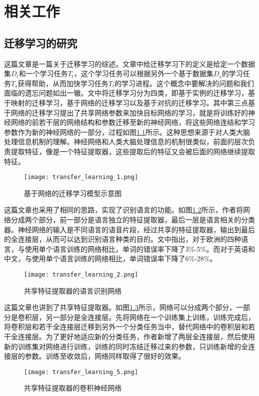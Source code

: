 
\chapter{相关工作}
\section{迁移学习的研究}

这篇文章\cite{10.1007/978-3-030-01424-7_27}是一篇关于迁移学习的综述。文章中给迁移学习下的定义是给定一个数据集$D_t$和一个学习任务$T_t$，这个学习任务可以根据另外一个基于数据集$D_s$的学习任务$T_s$获得帮助，从而加快学习任务$T_t$的学习进程。这个概念中要解决的问题和我们面临的遗忘问题如出一辙。文中将迁移学习分为四类，即基于实例的迁移学习，基于映射的迁移学习，基于网络的迁移学习以及基于对抗的迁移学习。其中第三点基于网络的迁移学习提出了共享网络参数来加快目标网络的学习，就是将训练好的神经网络的前若干层的网络结构和参数迁移至新的神经网络，将这些网络连结和学习参数作为新的神经网络的一部分，过程如图\ref{fig:transfer_learning_1}所示。这种思想来源于对人类大脑处理信息机制的理解。神经网络和人类大脑处理信息的机制很类似，前面的层次负责提取特征，像是一个特征提取器，这些提取后的特征又会被后面的网络继续提取特征。
\begin{figure}
    \centering
    \texttt{[image: transfer\_learning\_1.png]}
    \caption{基于网络的迁移学习模型示意图\cite{10.1007/978-3-030-01424-7_27}}
    \label{fig:transfer_learning_1}
\end{figure}

这篇文章\cite{6639081}也采用了相同的思路，实现了识别语言的功能。如图\ref{fig:transfer_learning_2}所示，作者将网络分成两个部分，前一部分是语言独立的特征提取器，最后一层是语言相关的分类器。神经网络的输入是不同语言的语音片段，经过共享的特征提取器，输出到最后的全连接层，从而可以达到识别语言种类的目的。文中指出，对于欧洲的四种语言，与使用单个语言训练的网络相比，单词的错误率下降了3\%-5\%。而对于英语和中文，与使用单个语言训练的网络相比，单词错误率下降了6\%-28\%。
\begin{figure}
    \centering
    \texttt{[image: transfer\_learning\_2.png]}
    \caption{共享特征提取器的语言识别网络\cite{6639081}}
    \label{fig:transfer_learning_2}
\end{figure}

这篇文章\cite{Oquab_2014_CVPR}也讲到了共享特征提取器。如图\ref{fig:transfer_learning_5}所示，网络可以分成两个部分，一部分是卷积层，另一部分是全连接层。先将网络在一个训练集上训练，训练完成后，将卷积层和若干全连接层迁移到另外一个分类任务当中，替代网络中的卷积层和若干全连接层。为了更好地适应新的分类任务，作者新增了两层全连接层，然后使用新的训练集对网络进行训练，训练的同时冻结迁移过来的参数，只训练新增的全连接层的参数。训练至收敛后，网络同样取得了很好的效果。 
\begin{figure}
    \centering
    \texttt{[image: transfer\_learning\_5.png]}
    \caption{共享特征提取器的卷积神经网络\cite{Oquab_2014_CVPR}}
    \label{fig:transfer_learning_5}
\end{figure}

